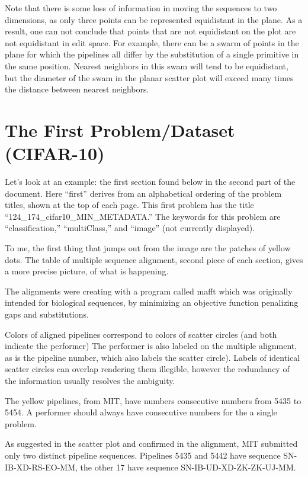 \documentclass{article}
\begin{document}
Note that there is some loss of information in moving the sequences to
two dimensions, as only three points can be represented equidistant in
the plane.  As a result, one can not conclude that points that are not
equidistant on the plot are not equidistant in edit space.  For
example, there can be a swarm of points in the plane for which the
pipelines all differ by the substitution of a single primitive in the
same position.  Nearest neighbors in this swam will tend to be
equidistant, but the diameter of the swam in the planar scatter plot
will exceed many times the distance between nearest neighbors.

\section{The First Problem/Dataset (CIFAR-10)}

Let's look at an example: the first section found below in the second
part of the document.  Here ``first'' derives from an alphabetical
ordering of the problem titles, shown at the top of each page.  This
first problem has the title ``124\_174\_cifar10\_MIN\_METADATA.''  The
keywords for this problem are ``classification,'' ``multiClass,'' and
``image'' (not currently displayed).

To me, the first thing that jumps out from the image are the patches
of yellow dots.  The table of multiple sequence alignment, second piece
of each section, gives a more precise picture, of what is happening.

The alignments were creating with a program called mafft which was
originally intended for biological sequences, by minimizing an
objective function penalizing gaps and substitutions.

Colors of aligned pipelines correspond to colors of scatter circles
(and both indicate the performer) The performer is also labeled on the
multiple alignment, as is the pipeline number, which also labels the
scatter circle).  Labels of identical scatter circles can overlap
rendering them illegible, however the redundancy of the information
usually resolves the ambiguity.

The yellow pipelines, from MIT, have numbers consecutive numbers from
5435 to 5454.  A performer should always have consecutive numbers for
the a single problem.

As suggested in the scatter plot and confirmed in the alignment, MIT
submitted only two distinct pipeline sequences.  Pipelines 5435 and
5442 have sequence SN-IB-XD-RS-EO-MM, the other 17 have sequence
SN-IB-UD-XD-ZK-ZK-UJ-MM.
\end{document}
